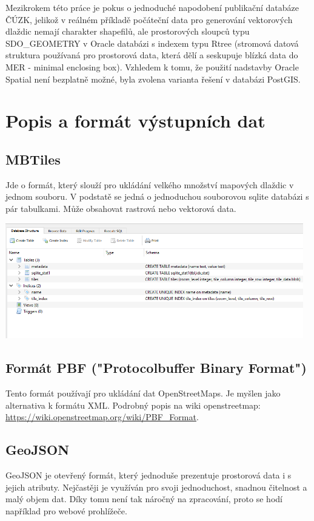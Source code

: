 \documentclass[12pt]{article}
\begin{document}
\indent Mezikrokem této práce je pokus o jednoduché napodobení publikační databáze ČÚZK, jelikož v reálném příkladě počáteční data pro generování vektorových dlaždic nemají charakter shapefilů, ale prostorových sloupců typu SDO\_GEOMETRY v Oracle databázi s indexem typu Rtree  (stromová datová struktura používaná pro prostorová data, která dělí a seskupuje blízká data do MER - minimal enclosing box). Vzhledem k tomu, že použití nadstavby Oracle Spatial není bezplatně možné, byla zvolena varianta řešení v databázi PostGIS.



\clearpage 
\section{Popis a formát výstupních dat}

\subsection{MBTiles}
Jde o formát, který slouží pro ukládání velkého množství mapových dlaždic v jednom souboru. V podstatě se jedná o jednoduchou souborovou sqlite databázi s pár tabulkami. Může obsahovat rastrová nebo vektorová data.

\begin{center}
	\includegraphics[width=13cm]{./img/mbtiles_db_structure.png}
\end{center}

\subsection{Formát PBF ("Protocolbuffer Binary Format")}
Tento formát používají pro ukládání dat OpenStreetMaps. Je myšlen jako alternativa k formátu XML. Podrobný popis na wiki openstreetmap: \url{https://wiki.openstreetmap.org/wiki/PBF_Format}.

\subsection{GeoJSON}
GeoJSON je otevřený formát, který jednoduše prezentuje prostorová data i s jejich atributy. Nejčastěji je využíván pro svoji jednoduchost, snadnou čitelnost a malý objem dat. Díky tomu není tak náročný na zpracování, proto se hodí například pro webové prohlížeče.
\end{document}
